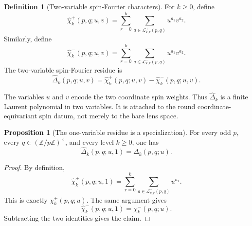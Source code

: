 \documentclass{article}
\theoremstyle{definition}
\newtheorem{definition}[theorem]{Definition}
\newtheorem{proposition}[theorem]{Proposition}
\numberwithin{equation}{section}
\begin{document}
\begin{definition}[Two-variable spin-Fourier characters]
For $k\geq0$, define
\begin{equation}
\widehat\chi_k^+(p,q;u,v)
=
\sum_{r=0}^{k}
\sum_{a\in\mathcal L_{k,r}^+(p,q)}
u^{a_1}v^{a_2}.
\end{equation}
Similarly, define
\begin{equation}
\widehat\chi_k^-(p,q;u,v)
=
\sum_{r=0}^{k}
\sum_{a\in\mathcal L_{k,r}^-(p,q)}
u^{a_1}v^{a_2}.
\end{equation}
The two-variable spin-Fourier residue is
\begin{equation}
\widehat\Delta_k(p,q;u,v)
=
\widehat\chi_k^+(p,q;u,v)
-
\widehat\chi_k^-(p,q;u,v).
\end{equation}
\end{definition}

The variables $u$ and $v$ encode the two coordinate spin weights.  Thus $\widehat\Delta_k$ is a finite Laurent polynomial in two variables.  It is attached to the round coordinate-equivariant spin datum, not merely to the bare lens space.

\begin{proposition}[The one-variable residue is a specialization]
For every odd $p$, every $q\in(\mathbb Z/p\mathbb Z)^\times$, and every level $k\geq0$, one has
\begin{equation}
\widehat\Delta_k(p,q;u,1)
=
\Delta_k(p,q;u).
\end{equation}
\end{proposition}

\begin{proof}
By definition,
\begin{equation}
\widehat\chi_k^+(p,q;u,1)
=
\sum_{r=0}^{k}
\sum_{a\in\mathcal L_{k,r}^+(p,q)}
u^{a_1}.
\end{equation}
This is exactly $\chi_k^+(p,q;u)$.  The same argument gives
\begin{equation}
\widehat\chi_k^-(p,q;u,1)
=
\chi_k^-(p,q;u).
\end{equation}
Subtracting the two identities gives the claim.
\end{proof}
\end{document}

